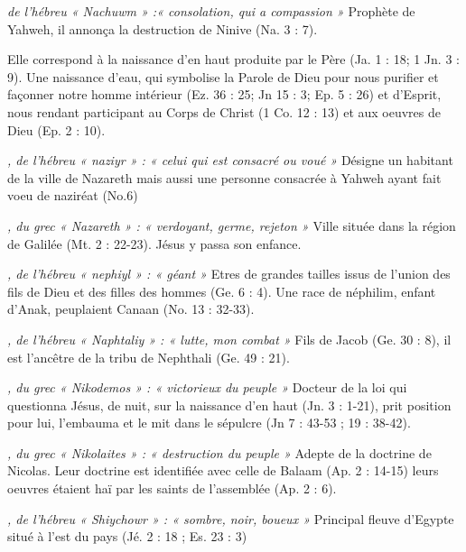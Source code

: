 \begin{multicols}{2}
\textit{de l'hébreu « Nachuwm » :« consolation, qui a compassion »}\newline
Prophète de Yahweh, il annonça la destruction de Ninive (Na. 3 : 7).

\textit{}\newline
Elle correspond à la naissance d'en haut produite par le Père (Ja. 1 : 18; 1 Jn. 3 : 9). Une naissance d'eau, qui symbolise la Parole de Dieu pour nous purifier et façonner notre homme intérieur (Ez. 36 : 25; Jn 15 : 3; Ep. 5 : 26) et d'Esprit, nous rendant participant au Corps de Christ (1 Co. 12 : 13) et aux oeuvres de Dieu (Ep. 2 : 10).

\textit{, de l'hébreu « naziyr » : « celui qui est consacré ou voué »}\newline
Désigne un habitant de la ville de Nazareth mais aussi une personne consacrée à Yahweh ayant fait voeu de naziréat (No.6)

\textit{, du grec « Nazareth » : « verdoyant, germe, rejeton »}\newline
Ville située dans la région de Galilée (Mt. 2 : 22-23). Jésus y passa son enfance.

\textit{, de l'hébreu « nephiyl » : « géant »}\newline
Etres de grandes tailles issus de l'union des fils de Dieu et des filles des hommes (Ge. 6 : 4). Une race de néphilim, enfant d'Anak, peuplaient Canaan (No. 13 : 32-33).

\textit{, de l'hébreu « Naphtaliy » : « lutte, mon combat »}\newline
Fils de Jacob (Ge. 30 : 8), il est l'ancêtre de la tribu de Nephthali (Ge. 49 : 21).

\textit{, du grec « Nikodemos » : « victorieux du peuple »}\newline
Docteur de la loi qui questionna Jésus, de nuit, sur la naissance d'en haut (Jn. 3 : 1-21), prit position pour lui, l'embauma et le mit dans le sépulcre (Jn 7 : 43-53 ; 19 : 38-42).

\textit{, du grec « Nikolaites » : « destruction du peuple »}\newline
Adepte de la doctrine de Nicolas. Leur doctrine est identifiée avec celle de Balaam (Ap. 2 : 14-15) leurs oeuvres étaient haï par les saints de l'assemblée (Ap. 2 : 6).

\textit{, de l'hébreu « Shiychowr » : « sombre, noir, boueux »}\newline
Principal fleuve d’Egypte situé à l'est du pays (Jé. 2 : 18 ; Es. 23 : 3)


\end{multicols}
